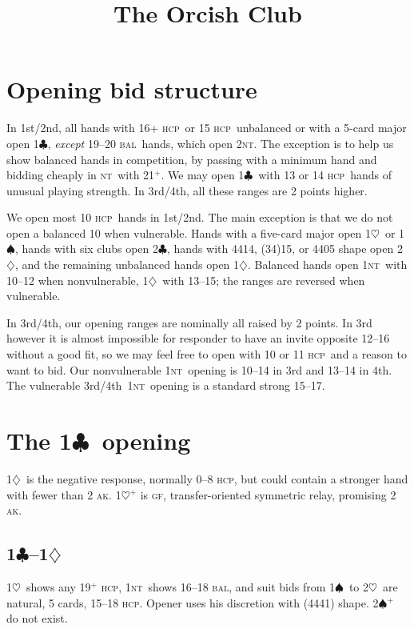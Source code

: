 \documentclass{report}
\title{The Orcish Club}
\newcommand{\fs}{1st/2nd}
\newcommand{\tf}{3rd/4th}
\newcommand{\hcp}{\textsc{hcp}}
\newcommand{\bal}{\textsc{bal}}
\newcommand{\ak}{\textsc{ak}}
\newcommand{\gf}{\textsc{gf}}
\renewcommand{\c}{\ensuremath{\clubsuit}}
\renewcommand{\d}{\ensuremath{\diamondsuit}}
\newcommand{\h}{\ensuremath{\heartsuit}}
\newcommand{\s}{\ensuremath{\spadesuit}}
\newcommand{\nt}{\textsc{nt}}
\newcommand{\+}{\ensuremath{^+}}
\begin{document}
\maketitle
\tableofcontents
\listoffigures

\chapter{Opening bid structure}

In \fs, all hands with 16+ \hcp\ or 15 \hcp\ unbalanced or with a
5-card major open 1\c, \emph{except} 19--20 \bal\ hands, which open
2\nt.  The exception is to help us show balanced hands in competition,
by passing with a minimum hand and bidding cheaply in \nt\ with 21\+.
We may open 1\c\ with 13 or 14 \hcp\ hands of unusual playing
strength.  In \tf, all these ranges are 2 points higher.

We open most 10 \hcp\ hands in \fs.  The main exception is that we do
not open a balanced 10 when vulnerable.  Hands with a five-card major
open 1\h\ or 1\s, hands with six clubs open 2\c, hands with 4414,
(34)15, or 4405 shape open 2\d, and the remaining unbalanced hands
open 1\d.  Balanced hands open 1\nt\ with 10--12 when nonvulnerable,
1\d\ with 13--15; the ranges are reversed when vulnerable.

In \tf, our opening ranges are nominally all raised by 2 points.  In
3rd however it is almost impossible for responder to have an invite
opposite 12--16 without a good fit, so we may feel free to open with
10 or 11 \hcp\ and a reason to want to bid.  Our nonvulnerable
1\nt\ opening is 10--14 in 3rd and 13--14 in 4th.  The vulnerable
\tf\ 1\nt\ opening is a standard strong 15--17.

\chapter{The 1\c\ opening}

1\d\ is the negative response, normally 0--8 \hcp, but could contain a
stronger hand with fewer than 2 \ak.  1\h\+ is \gf, transfer-oriented
symmetric relay, promising 2 \ak.

\section{1\c--1\d}
1\h\ shows any 19\+ \hcp, 1\nt\ shows 16--18 \bal, and suit bids
from 1\s\ to 2\h\ are natural, 5 cards, 15--18 \hcp.  Opener uses his
discretion with (4441) shape.  2\s\+ do not exist.
\end{document}
